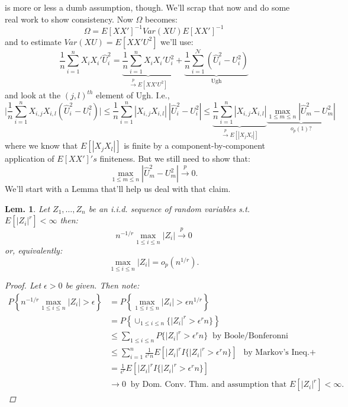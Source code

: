 \documentclass{tufte-book}
\theoremstyle{mytheoremstyle}
\newtheorem*{thm}{Thm.}
\theoremstyle{mylemstyle}
\newtheorem*{lem}{Lem.}
\theoremstyle{mydefstyle}
\begin{document}
 is more or less a dumb assumption, though. We'll scrap that now and do some real work to show consistency. Now \(\Omega\) becomes:
	\[\Omega = E[XX']^{-1}Var(XU)E[XX']^{-1}\]
and to estimate \(Var(XU) = E[XX'U^2]\) we'll use:
	\[\frac{1}{n}\sum_{i=1}^n X_iX_i'\hat{U}_i^2 = \underbrace{\frac{1}{n}\sum_{i=1}^n X_iX_i' U_i^2}_\textrm{\(\overset{p}{\rightarrow} E[XX'U^2]\)} + \underbrace{\frac{1}{n}\sum_{i=1}^\mathcal{N}(\hat{U}_i^2 - U_i^2)}_\textrm{Ugh}\]
and look at the \((j,l)^{th}\) element of Ugh. I.e.,
	\[\lvert \frac{1}{n} \sum_{i=1}^n X_{i,j} X_{i,l}(\hat{U}^2_i - U_i^2)\rvert \le \frac{1}{n}\sum_{i=1}^n |X_{i,j}X_{i,l}|\ |\hat{U}^2_i - U_i^2| \le \underbrace{\frac{1}{n}\sum_{i=1}^n |X_{i,j}X_{i,l}|}_\textrm{\(\overset{p}{\rightarrow} E[|X_jX_l|]\)} \underbrace{\max_{1 \le m \le n} |\hat{U}^2_m - U_m^2|}_\textrm{\(o_p(1)?\)}\]
where we know that \(E[|X_j X_l|] \) is finite by a component-by-component application of \(E[XX']'s\) finiteness. But we still need to show that:
	\[\max_{1 \le m \le n} |\hat{U}^2_m - U^2_m| \overset{p}{\rightarrow} 0 \text{.}\]
We'll start with a Lemma that'll help us deal with that claim.
\begin{lem} Let \(Z_1, \dots, Z_n\) be an i.i.d. sequence of random variables s.t. \(E[|Z_i|^r] < \infty\) then:
	\[n^{-1/r} \max_{1 \le i \le n} |Z_i| \overset{p}{\rightarrow} 0\]
or, equivalently:
	\[\max_{1 \le i \le n} |Z_i| = o_p\left(n^{1/r}\right)\text{.}\]
	\begin{proof} Let \(\epsilon > 0\) be given. Then note:
		\begin{align*}
			P\left\{n^{-1/r}\max_{1 \le i \le n} |Z_i| > \epsilon \right\} & = P\left\{\max_{1 \le i \le n} |Z_i| > \epsilon n^{1/r} \right\} \\
														& = P\left\{\cup_{1 \le i \le n} \{|Z_i|^r > \epsilon^r n\}\right\} \\
														& \le \sum_{1 \le i \le n} P\{|Z_i|^r > \epsilon^r n\}\ \text{ by Boole/Bonferonni }\\
														& \le \sum_{i = 1}^n \frac{1}{\epsilon^r n} E[|Z_i|^r I\{|Z_i|^r > \epsilon^r n\}]\ \text{ by Markov's Ineq.\(+\)} \\
														& = \frac{1}{\epsilon^r} E[|Z_i|^r I\{|Z_i|^r > \epsilon^r n\}] \\
														& \rightarrow 0\ \text{ by Dom. Conv. Thm. and assumption that } E[|Z_i|^r] < \infty \text{.}
		\end{align*}
	\end{proof}
\end{lem}
\end{document}
